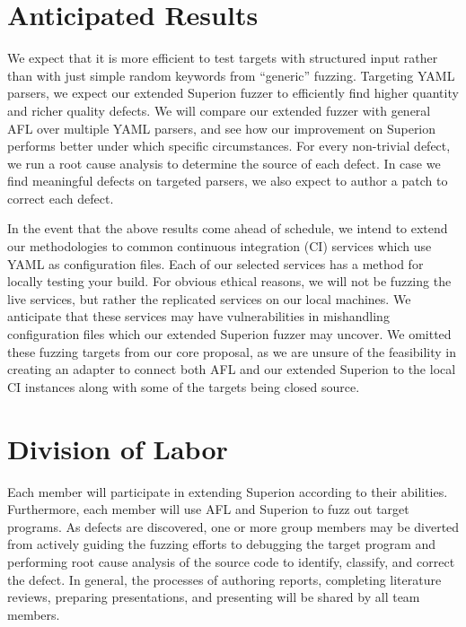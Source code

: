 \documentclass[12pt]{diazessay}
\begin{document}
\vspace{-0.25cm}
\section*{Anticipated Results}
\label{results}
\vspace{-0.25cm}

We expect that it is more efficient to test targets with structured input rather than with just simple random keywords from ``generic'' fuzzing.
Targeting YAML parsers, we expect our extended Superion fuzzer to efficiently find higher quantity and richer quality defects.
We will compare our extended fuzzer with general AFL over multiple YAML parsers, and see how our improvement on Superion performs better under which specific circumstances.
For every non-trivial defect, we run a root cause analysis to determine the source of each defect.
In case we find meaningful defects on targeted parsers, we also expect to author a patch to correct each defect.

In the event that the above results come ahead of schedule, we intend to extend our methodologies to common continuous integration (CI\cite{cicd}) services\cite{trevisci}\cite{circleci}\cite{jeninks} which use YAML as configuration files.
Each of our selected services has a method for locally testing your build.
For obvious ethical reasons, we will not be fuzzing the live services, but rather the replicated services on our local machines.
We anticipate that these services may have vulnerabilities in mishandling configuration files which our extended Superion fuzzer may uncover.
We omitted these fuzzing targets from our core proposal, as we are unsure of the feasibility in creating an adapter to connect both AFL and our extended Superion to the local CI instances along with some of the targets being closed source.


\section*{Division of Labor}

Each member will participate in extending Superion according to their abilities.
Furthermore, each member will use AFL and Superion to fuzz out target programs.
As defects are discovered, one or more group members may be diverted from actively guiding the fuzzing efforts to debugging the target program and performing root cause analysis of the source code to identify, classify, and correct the defect.
In general, the processes of authoring reports, completing literature reviews, preparing presentations, and presenting will be shared by all team members.
\end{document}
